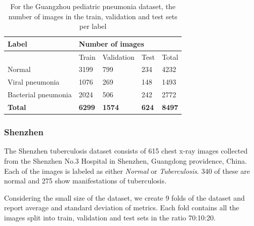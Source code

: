 \documentclass[8pt]{beamer}
\begin{document}
\begin{frame}
  \begin{table}[]
    \centering
    \begin{tabular}{@{}lllll@{}}
      \toprule
      \textbf{Label}      & \multicolumn{4}{l}{\textbf{Number of images}}  \\ \midrule
                          & Train     & Validation & Test      & Total     \\ \midrule
      Normal              & 3199      & 799        & 234       & 4232           \\ \midrule
      Viral pneumonia     & 1076      & 269        & 148       & 1493          \\ \midrule
      Bacterial pneumonia & 2024      & 506        & 242       & 2772          \\ \midrule
      \textbf{Total}      & \textbf{6299} & \textbf{1574}  & \textbf{624} & \textbf{8497} \\ \bottomrule
    \end{tabular}
    \caption{For the Guangzhou pediatric pneumonia dataset, the number of images
      in the train, validation and test sets per label}
    \label{tab:guangzhou_split}
  \end{table}


\end{frame}

\begin{frame}
  \frametitle{Shenzhen} The Shenzhen tuberculosis dataset consists of 615 chest
  x-ray images collected from the Shenzhen No.3 Hospital in Shenzhen, Guangdong
  providence, China. Each of the images is labeled as either \emph{Normal} or
  \emph{Tuberculosis}. 340 of these are normal and 275 show manifestations of
  tuberculosis.\\ \pause

  \vspace{\baselineskip}

  Considering the small size of the dataset, we create 9 folds of the dataset
  and report average and standard deviation of metrics. Each fold contains all
  the images split into train, validation and test sets in the ratio 70:10:20.


\end{frame}
\end{document}
